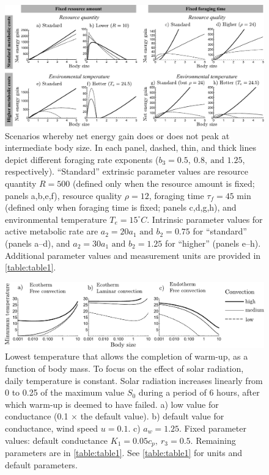 \begin{figure}
\includegraphics[width=\textwidth]{fig2}
\caption{
    \setstretch{\stretchby}
    Scenarios whereby net energy gain does or does not peak at intermediate body size.
    In each panel, dashed, thin, and thick lines depict different foraging rate exponents ($b_3 = 0.5,\ 0.8,\ \text{and } 1.25$, respectively).
    ``Standard'' extrinsic parameter values are 
    resource quantity $R = 500$ (defined only when the resource amount is fixed; panels a,b,e,f),
    resource quality $\rho = 12$,
    foraging time $\tau_f = 45 \text{ min}$ (defined only when foraging time is fixed; panels c,d,g,h), 
    and environmental temperature $T_e = 15^\circ C$.
    Intrinsic parameter values for active metabolic rate are $a_2 = 20 a_1 \text{ and } b_2 = 0.75$ for ``standard'' (panels a--d), and $a_2 = 30 a_1 \text{ and } b_2  = 1.25$ for ``higher'' (panels e--h).
    Additional parameter values and measurement units are provided in \cref{table:table1}.
}
\label{fig2}
\end{figure}

\begin{figure}
\includegraphics[width=\textwidth]{fig3}
\caption{
    \setstretch{\stretchby}
	Lowest temperature that allows the completion of warm-up, as a function of body mass.
	To focus on the effect of solar radiation, daily temperature is constant.
	Solar radiation increases linearly from 0 to 0.25 of the maximum value $S_0$ during a period of 6 hours, after which warm-up is deemed to have failed.
	a)  low value for conductance (0.1 $\times$ the default value).
	b) default value for conductance, wind speed  $u = 0.1$.
	c)  $a_w = 1.25$.
	Fixed parameter values: default conductance $K_1 = 0.05c_p,\ r_3 = 0.5$.
	Remaining parameters are in \cref{table:table1}.
	See \cref{table:table1} for units and default parameters.
}
\label{fig3}
\end{figure}

